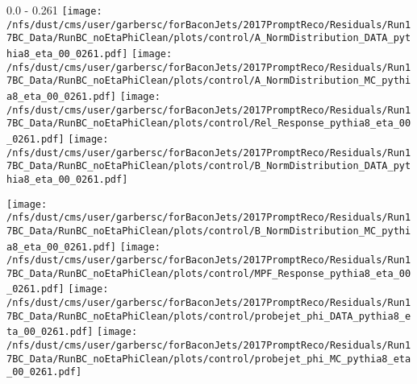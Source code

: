 \documentclass[t,compress]{beamer}
\begin{document}
\begin{frame}{0.0 - 0.261}
	\texttt{[image: /nfs/dust/cms/user/garbersc/forBaconJets/2017PromptReco/Residuals/Run17BC\_Data/RunBC\_noEtaPhiClean/plots/control/A\_NormDistribution\_DATA\_pythia8\_eta\_00\_0261.pdf]}
	\texttt{[image: /nfs/dust/cms/user/garbersc/forBaconJets/2017PromptReco/Residuals/Run17BC\_Data/RunBC\_noEtaPhiClean/plots/control/A\_NormDistribution\_MC\_pythia8\_eta\_00\_0261.pdf]}
	\texttt{[image: /nfs/dust/cms/user/garbersc/forBaconJets/2017PromptReco/Residuals/Run17BC\_Data/RunBC\_noEtaPhiClean/plots/control/Rel\_Response\_pythia8\_eta\_00\_0261.pdf]}
	\texttt{[image: /nfs/dust/cms/user/garbersc/forBaconJets/2017PromptReco/Residuals/Run17BC\_Data/RunBC\_noEtaPhiClean/plots/control/B\_NormDistribution\_DATA\_pythia8\_eta\_00\_0261.pdf]}
\newline

	\texttt{[image: /nfs/dust/cms/user/garbersc/forBaconJets/2017PromptReco/Residuals/Run17BC\_Data/RunBC\_noEtaPhiClean/plots/control/B\_NormDistribution\_MC\_pythia8\_eta\_00\_0261.pdf]}
	\texttt{[image: /nfs/dust/cms/user/garbersc/forBaconJets/2017PromptReco/Residuals/Run17BC\_Data/RunBC\_noEtaPhiClean/plots/control/MPF\_Response\_pythia8\_eta\_00\_0261.pdf]}
	\texttt{[image: /nfs/dust/cms/user/garbersc/forBaconJets/2017PromptReco/Residuals/Run17BC\_Data/RunBC\_noEtaPhiClean/plots/control/probejet\_phi\_DATA\_pythia8\_eta\_00\_0261.pdf]}
	\texttt{[image: /nfs/dust/cms/user/garbersc/forBaconJets/2017PromptReco/Residuals/Run17BC\_Data/RunBC\_noEtaPhiClean/plots/control/probejet\_phi\_MC\_pythia8\_eta\_00\_0261.pdf]}
\end{frame}
\end{document}
